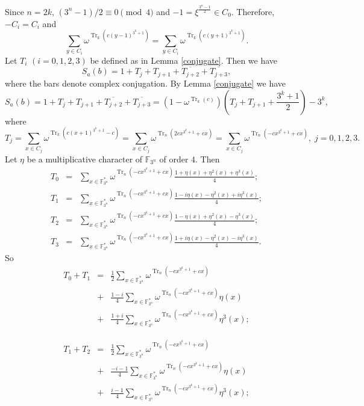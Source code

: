\documentclass[11pt, reqno]{amsart}
\newcommand{\Ff}{{\mathbb F}}
\def\Tr{\operatorname{Tr}}
\def\Tr{\operatorname{Tr}}
\begin{document}
Since $n=2k$, $(3^n-1)/2\equiv 0 \pmod 4$ and
$-1=\xi^{\frac{3^n-1}{2}}\in C_0$. Therefore, $-C_i=C_i$ and
$$\sum_{y \in C_i}\omega^{\Tr_k(c(y-1)^{3^k+1})}=\sum_{y \in C_i}\omega^{\Tr_k(c(y+1)^{3^k+1})}.$$
Let $T_i$ $(i=0,1,2,3)$ be defined as in Lemma \ref{conjugate}. Then
we have
\begin{equation*}
S_a(b)=1+T_j+T_{j+1}+\overline{T_{j+2}}+\overline{T_{j+3}},
\end{equation*}
where the bars denote complex conjugation. By Lemma \ref{conjugate}
we have
\begin{equation}\label{sum}
S_a(b)=1+T_j+T_{j+1}+\overline{T_{j+2}}+\overline{T_{j+3}}=\left(1-\omega^{\Tr_k(c)}\right)\left(T_j+T_{j+1}+\frac{3^k+1}{2}\right)-3^k,
\end{equation}
where
$$T_j=\sum_{x \in C_j}\omega^{\Tr_k(c(x+1)^{3^k+1}-c)}=\sum_{x \in C_j}\omega^{\Tr_n(2cx^{3^k+1}+cx)}
=\sum_{x \in C_j}\omega^{\Tr_n(-cx^{3^k+1}+cx)}, \;j=0,1,2,3.$$ Let
$\eta$ be a multiplicative character of $\Ff_{3^n}$ of order $4$.
Then
\begin{eqnarray*}
T_0&=&\sum_{x \in \Ff_{3^n}^*}\omega^{\Tr_n(-cx^{3^k+1}+cx)}\frac{1+\eta(x)+\eta^2(x)+\eta^3(x)}{4};\\
T_1&=&\sum_{x \in \Ff_{3^n}^*}\omega^{\Tr_n(-cx^{3^k+1}+cx)}\frac{1-i\eta(x)-\eta^2(x)+i\eta^3(x)}{4};\\
T_2&=&\sum_{x \in \Ff_{3^n}^*}\omega^{\Tr_n(-cx^{3^k+1}+cx)}\frac{1-\eta(x)+\eta^2(x)-\eta^3(x)}{4};\\
T_3&=&\sum_{x \in
\Ff_{3^n}^*}\omega^{\Tr_n(-cx^{3^k+1}+cx)}\frac{1+i\eta(x)-\eta^2(x)-i\eta^3(x)}{4}.
\end{eqnarray*}
So
\begin{eqnarray}
T_0+T_1&=&\frac{1}{2}\sum_{x \in \Ff_{3^n}^*}\omega^{\Tr_n(-cx^{3^k+1}+cx)}\nonumber\\
&+&\frac{1-i}{4}\sum_{x \in \Ff_{3^n}^*}\omega^{\Tr_n(-cx^{3^k+1}+cx)}\eta(x)\nonumber\\
&+&\frac{1+i}{4}\sum_{x \in
\Ff_{3^n}^*}\omega^{\Tr_n(-cx^{3^k+1}+cx)}\eta^3(x); \label{tsum0}
\end{eqnarray}

\begin{eqnarray}
T_1+T_2&=&\frac{1}{2}\sum_{x \in \Ff_{3^n}^*}\omega^{\Tr_n(-cx^{3^k+1}+cx)}\nonumber \\
&+&\frac{-i-1}{4}\sum_{x \in \Ff_{3^n}^*}\omega^{\Tr_n(-cx^{3^k+1}+cx)}\eta(x)\nonumber \\
&+&\frac{i-1}{4}\sum_{x \in
\Ff_{3^n}^*}\omega^{\Tr_n(-cx^{3^k+1}+cx)}\eta^3(x);\label{tsum1}
\end{eqnarray}
\end{document}
